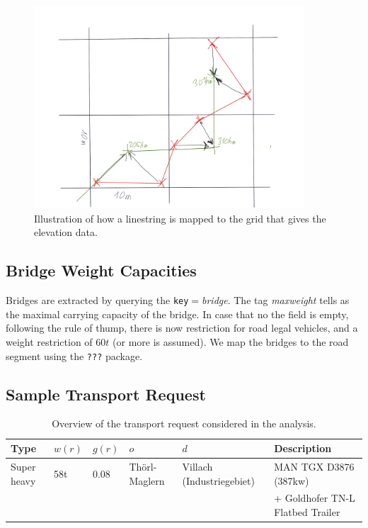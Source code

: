 \begin{figure}[!ht]
  \includegraphics[width=0.9\textwidth]{./figures/mapping.png}
  \caption{Illustration of how a linestring is mapped to the grid that gives the elevation data.}
  \label{fig:mapelev}
\end{figure}


\subsection{Bridge Weight Capacities}
Bridges are extracted by querying the \texttt{key}$=$\textit{bridge}. The tag \textit{maxweight}
tells as the maximal carrying capacity of the bridge. In case that no the field is empty,
following the rule of thump, there is now restriction for road legal vehicles, and
a weight restriction of $60t$ (or more is assumed).
We map the bridges to the road segment using the \texttt{???} package.


\subsection{Sample Transport Request}

\begin{table}[!ht]
  \caption{Overview of the transport request considered in the analysis.}
  \label{tab:request}
  \centering
\begin{tabular}{l|llll|l}
Type  & $w(r)$  & $g(r)$  & $o$  & $d$ & Description\\ \hline\hline
Super heavy  & 58t  & 0.08 & Thörl-Maglern  & Villach (Industriegebiet) &  MAN TGX D3876 (387kw)\\
&&&&& + Goldhofer TN-L Flatbed Trailer
\\ \hline
\end{tabular}
\end{table}


